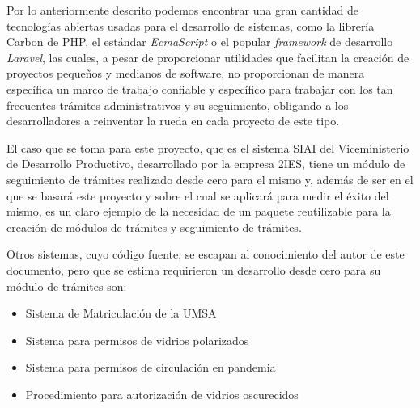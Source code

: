Por lo anteriormente descrito podemos encontrar una gran cantidad de tecnologías
abiertas usadas para el desarrollo de sistemas, como la librería Carbon de PHP,
el estándar \textit{EcmaScript} o el popular \textit{framework} de desarrollo \textit{Laravel}, las cuales,
a pesar de proporcionar utilidades que facilitan la creación de proyectos
pequeños y medianos de software, no proporcionan de manera específica un marco
de trabajo confiable y específico para trabajar con los tan frecuentes trámites
administrativos y su seguimiento, obligando a los desarrolladores a reinventar
la rueda en cada proyecto de este tipo.

El caso que se toma para este proyecto, que es el sistema SIAI del
Viceministerio de Desarrollo Productivo, desarrollado por la empresa 2IES, tiene
un módulo de seguimiento de trámites realizado desde cero para el mismo y,
además de ser en el que se basará este proyecto y sobre el cual se aplicará para
medir el éxito del mismo, es un claro ejemplo de la necesidad de un paquete
reutilizable para la creación de módulos de trámites y seguimiento de trámites.

Otros sistemas, cuyo código fuente, se escapan al conocimiento del autor de este
documento, pero que se estima requirieron un desarrollo desde cero para su
módulo de trámites son:

\begin{itemize}
    \item Sistema de Matriculación de la UMSA

    \item Sistema para permisos de vidrios polarizados

    \item Sistema para permisos de circulación en pandemia

    \item Procedimiento para autorización de vidrios oscurecidos
\end{itemize}

